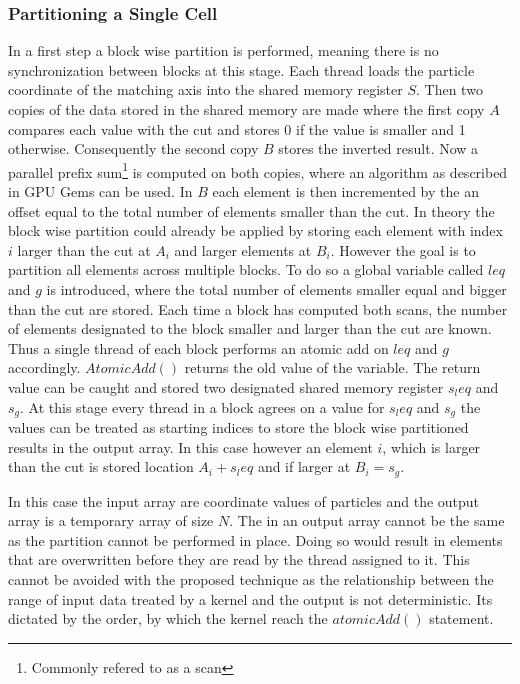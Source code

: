 \documentclass[]{article}
\begin{document}
\subsubsection{Partitioning a Single Cell}

In a first step a block wise partition is performed, meaning there is no synchronization between blocks at this stage. Each thread loads the particle coordinate of the matching axis into the shared memory register $S$. Then two copies of the data stored in the shared memory are made where the first copy $A$ compares each value with the cut and stores 0 if the value is smaller and 1 otherwise. Consequently the second copy $B$ stores the inverted result. 
Now a parallel prefix sum\footnote{Commonly refered to as a scan} is computed on both copies, where an algorithm as described in GPU Gems \cite{SCAN} can be used. In $B$ each element is then incremented by the an offset equal to the total number of elements smaller than the cut. 
In theory the block wise partition could already be applied by storing each element with index $i$ larger than the cut at $A_i$ and larger elements at $B_i$. 
However the goal is to partition all elements across multiple blocks. To do so a global variable called $leq$ and $g$ is introduced, where the total number of elements smaller equal and bigger than the cut are stored. Each time a block has computed both scans, the number of elements designated to the block smaller and larger than the cut are known. Thus a single thread of each block performs an atomic add on $leq$ and $g$ accordingly. $AtomicAdd()$ returns the old value of the variable. The return value can be caught and stored two designated shared memory register $s_leq$ and $s_g$. 
At this stage every thread in a block agrees on a value for $s_leq$ and $s_g$ the values can be treated as starting indices to store the block wise partitioned results in the output array. In this case however an element $i$, which is larger than the cut is stored location $A_i + s_leq$ and if larger at $B_i = s_g$. 

In this case the input array are coordinate values of particles and the output array is a temporary array of size $N$. The in an output array cannot be the same as the partition cannot be performed in place. Doing so would result in elements that are overwritten before they are read by the thread assigned to it. This cannot be avoided with the proposed technique as the relationship between the range of input data treated by a kernel and the output is not deterministic. Its dictated by the order, by which the kernel reach the $atomicAdd()$ statement. 
\end{document}
